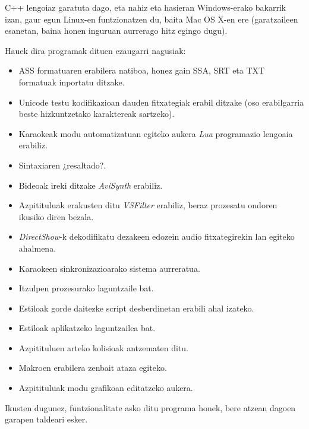 C++ lengoiaz garatuta dago, eta nahiz eta hasieran Windows-erako bakarrik izan, gaur egun Linux-en funtzionatzen du, baita Mac OS X-en ere (garatzaileen esanetan, baina honen inguruan aurrerago hitz egingo dugu).

Hauek dira programak dituen ezaugarri nagusiak:
\begin{itemize}
\item ASS formatuaren erabilera natiboa, honez gain SSA, SRT eta TXT formatuak inportatu ditzake.
\item Unicode testu kodifikazioan dauden fitxategiak erabil ditzake (oso erabilgarria beste hizkuntzetako karaktereak sartzeko).
\item Karaokeak modu automatizatuan egiteko aukera \textit{Lua} programazio lengoaia erabiliz.
\item Sintaxiaren ¿resaltado?.
\item Bideoak ireki ditzake \textit{AviSynth} erabiliz.
\item Azpitituluak erakusten ditu \textit{VSFilter} erabiliz, beraz prozesatu ondoren ikusiko diren bezala.
\item \textit{DirectShow}-k dekodifikatu dezakeen edozein audio fitxategirekin lan egiteko ahalmena.
\item Karaokeen sinkronizazioarako sistema aurreratua.
\item Itzulpen prozesurako laguntzaile bat.
\item Estiloak gorde daitezke script desberdinetan erabili ahal izateko.
\item Estiloak aplikatzeko laguntzailea bat.
\item Azpitituluen arteko kolisioak antzematen ditu.
\item Makroen erabilera zenbait ataza egiteko.
\item Azpitituluak modu grafikoan editatzeko aukera.
\end{itemize}

Ikusten dugunez, funtzionalitate asko ditu programa honek, bere atzean dagoen garapen taldeari esker.


